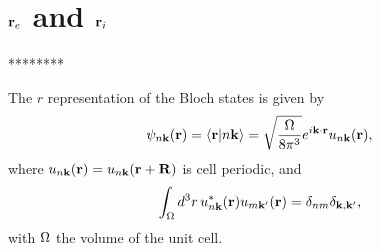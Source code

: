 \section{$\mathbf{r}_e$ and $\mathbf{r}_i$}
********

The $r$ representation of the
Bloch states is given by
\begin{equation}\label{bloch}
\psi_{n\mathbf{k}}(\mathbf{r})=\langle {\mathbf{r}} | {n\mathbf{k}} \rangle=\sqrt{\frac{\Omega}{8\pi^3}}
e^{i\mathbf{k} \cdot \mathbf{r}}u_{n\mathbf{k}}(\mathbf{r})
,
\end{equation}
where
$u_{n\mathbf{k}}(\mathbf{r})=u_{n\mathbf{k}}(\mathbf{r}+\mathbf{R})$ is cell periodic, and
\begin{equation}\label{normal}
\int_{\Omega}d^{3}r\, u_{n\mathbf{k}}^{*}(\mathbf{r})u_{m\mathbf{k}'}(\mathbf{r})=\delta_{nm}\delta_{\mathbf{\mathbf{k},\mathbf{k}'}}
,
\end{equation}
with $\Omega$ the volume of the unit cell.

